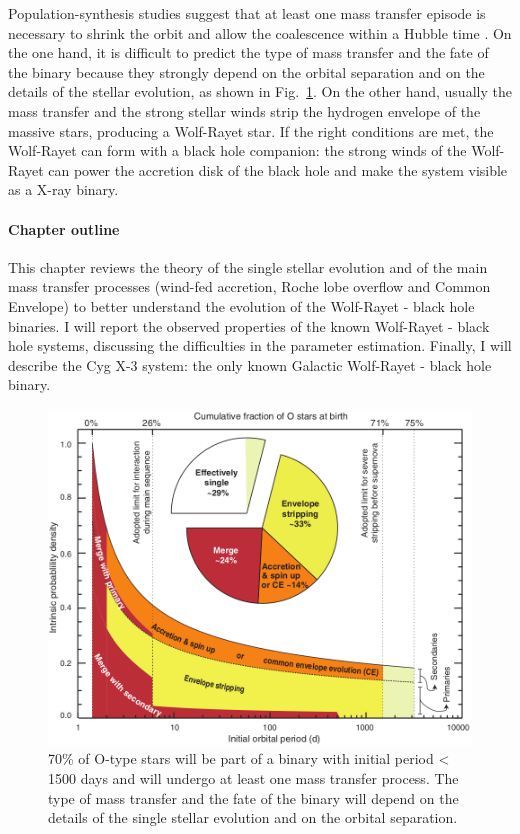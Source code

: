 \documentclass[a4paper,titlepage]{book}     	%
\begin{document}
Population-synthesis studies suggest that at least one mass transfer episode is necessary to shrink the orbit and allow the coalescence within a Hubble time \cite{spera2019_mergingBBH}. On the one hand, it is difficult to predict the type of mass transfer and the fate of the binary because they strongly depend on the orbital separation and on the details of the stellar evolution, as shown in Fig.\ \ref{fig:Sana2012MTfate}. On the other hand, usually the mass transfer and the strong stellar winds strip the hydrogen envelope of the massive stars, producing a Wolf-Rayet star. If the right conditions are met, the  Wolf-Rayet can form with a black hole companion: the strong winds of the Wolf-Rayet can power the accretion disk of the black hole and make the system visible as a X-ray binary.

\paragraph{Chapter outline}
This chapter reviews the theory of the single stellar evolution and of the main mass transfer processes (wind-fed accretion, Roche lobe overflow and Common Envelope) to better understand the evolution of the Wolf-Rayet - black hole binaries. I will report the observed properties of the known Wolf-Rayet - black hole systems, discussing the difficulties in the parameter estimation. Finally, I will describe the Cyg X-3 system: the only known Galactic Wolf-Rayet - black hole binary.


\begin{figure}[h!]
	\centering
	\includegraphics[width=.65\textwidth]{./images/Sana2012MTfate.png}
	\caption{70\% of O-type stars will be part of a binary with initial period < 1500 days and will undergo at least one mass transfer process. The type of mass transfer and the fate of the binary will depend on the details of the single stellar evolution and on the orbital separation. \cite{Sana2012}}\label{fig:Sana2012MTfate}
\end{figure}
\end{document}
